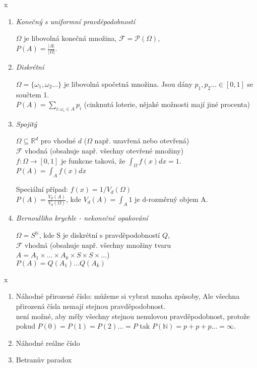 \documentclass[../main.tex]{subfiles}
\begin{document}
\begin{example}
    {\color{white} x} %
    \begin{enumerate}
        \item 
        \textit{Konečný s uniformní pravděpodobností}

        $\Omega$ je libovolná konečná množina, $\mathcal{F} = \mathcal{P}(\Omega)$,\\
        $P(A) = \frac{|A|}{|\Omega|}$.
        \item 
        \textit{Diskrétní}

        $\Omega = \{\omega_1,\omega_2\dots\}$ je libovolná spočetná množina. Jsou dány $p_1,p_2\dots \in [0,1]$ se součtem 1.\\
        $P(A) = \sum_{i:\omega_i \in A} p_i$ (cinknutá loterie, nějaké možnosti mají jiné procenta)
        \item 
        \textit{Spojitý}

        $\Omega \subseteq \mathbb{R}^d$ pro vhodné $d$ ($\Omega$ např. uzavřená nebo otevřená)\\
        $\mathcal{F}$ vhodná (obsahuje např. všechny otevřené množiny)\\
        $f:\Omega \rightarrow [0,1]$ je funkcne taková, že $\int_{\Omega} f(x)dx = 1$.\\
        $P(A) = \int_{A}f(x)dx$

        Speciální případ: $f(x) = 1/V_d(\Omega)$\\
        $P(A) = \frac{V_d(A)}{V_d(\Omega)}$, kde $V_d(A) = \int_A 1$ je d-rozměrný objem A.
        
        \item 
        \textit{Bernoulliho krychle - nekonečné opakování}

        $\Omega = S^{\mathbb{N}}$, kde S je diskrétní s pravděpodobností $Q$,\\
        $\mathcal{F}$ vhodná (obsahuje např. všechny množiny tvaru\\
        $A = A_1 \times \dots \times A_k \times S \times S \times \dots $)\\
        $P(A) = Q(A_1) \dots Q(A_k)$\\
    \end{enumerate}
\end{example}

\begin{example}[Nepříklady]
    {\color{white} x}
    \begin{enumerate}
        \item Náhodné přirozené číslo: můžeme si vybrat mnoha způsoby, Ale všechna přirozená čísla nemají stejnou pravděpodobnost.\\
        není možné, aby měly všechny stejnou nenulovou pravděpodobnost, protože pokud $P(0) = P(1) = P(2)\dots = P$ tak $P(\mathbb{N}) = p + p + p\dots = \infty$.
        \item Náhodné reálne číslo
        \item Betranův paradox
    \end{enumerate}
\end{example}
\end{document}
